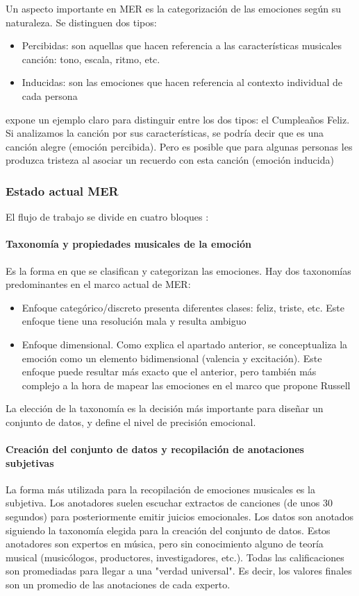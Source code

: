 \documentclass[12pt,a4paper,Spanish]{article}
\begin{document}
Un aspecto importante en MER es la categorización de las emociones según su naturaleza. Se distinguen dos tipos:
\begin{itemize}
\item Percibidas: son aquellas que hacen referencia a las características musicales canción: tono, escala, ritmo, etc.
\item Inducidas: son las emociones que hacen referencia al contexto individual de cada persona
\end{itemize}
\cite{yang2011music} expone un ejemplo claro para distinguir entre los dos tipos: el Cumpleaños Feliz. Si analizamos la canción por sus características, se podría decir que es una canción alegre (emoción percibida). Pero es posible que para algunas personas les produzca tristeza al asociar un recuerdo con esta canción (emoción inducida)

\subsubsection{Estado actual MER}
El flujo de trabajo se divide en cuatro bloques \cite{GomezCanon2021SPM}:


\paragraph{Taxonomía y propiedades musicales de la emoción}\label{tax_emo}
Es la forma en que se clasifican y categorizan las emociones. Hay dos taxonomías predominantes en el marco actual de MER:
\begin{itemize}
	\item Enfoque categórico/discreto presenta diferentes clases: feliz, triste, etc. Este enfoque tiene una resolución mala y resulta ambiguo
	\item Enfoque dimensional. Como explica el apartado anterior, se conceptualiza la emoción como un elemento bidimensional (valencia y excitación). Este enfoque puede resultar más exacto que el anterior, pero también más complejo a la hora de mapear las emociones en el marco que propone Russell \cite{posner2005circumplex}
\end{itemize}
La elección de la taxonomía es la decisión más importante para diseñar un conjunto de datos, y define el nivel de precisión emocional.

\paragraph{Creación del conjunto de datos y recopilación de anotaciones subjetivas}
La forma más utilizada para la recopilación de emociones musicales es la subjetiva. Los anotadores suelen escuchar extractos de canciones (de unos 30 segundos) para posteriormente emitir juicios emocionales. Los datos son anotados siguiendo la taxonomía elegida para la creación del conjunto de datos. Estos anotadores son expertos en música, pero sin conocimiento alguno de teoría musical (musicólogos, productores, investigadores, etc.).
\newline
Todas las calificaciones son promediadas para llegar a una "verdad universal". Es decir, los valores finales son un promedio de las anotaciones de cada experto.
\end{document}
